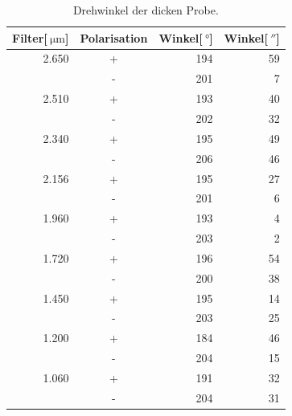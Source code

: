 \begin{table}
	\centering
	\caption[]{Drehwinkel der dicken Probe.}
	\begin{tabular}{r c r r }
		Filter[$\SI{}{\micro\meter}$] & Polarisation & Winkel[$\SI{}{\degree}$] & Winkel[$\SI{}{\arcsecond}$]\\
		\hline\hline
		2.650	&	+	&	194	&	59\\
				&	-	&	201	&	 7\\
		2.510	&	+	&	193	&	40\\
				&	-	&	202	&	32\\
		2.340	&	+	&	195	&	49\\
				&	-	&	206	&	46\\
		2.156	&	+	&	195	&	27\\
				&	-	&	201	&	 6\\
		1.960	&	+	&	193	&	 4\\
				&	-	&	203	&	 2\\
		1.720	&	+	&	196	&	54\\
				&	-	&	200	&	38\\
		1.450	&	+	&	195	&	14\\
				&	-	&	203	&	25\\
		1.200	&	+	&	184	&	46\\
				&	-	&	204	&	15\\
		1.060	&	+	&	191	&	32\\
				&	-	&	204	&	31\\
		\hline
	\end{tabular}
	\label{tab_2}
\end{table}